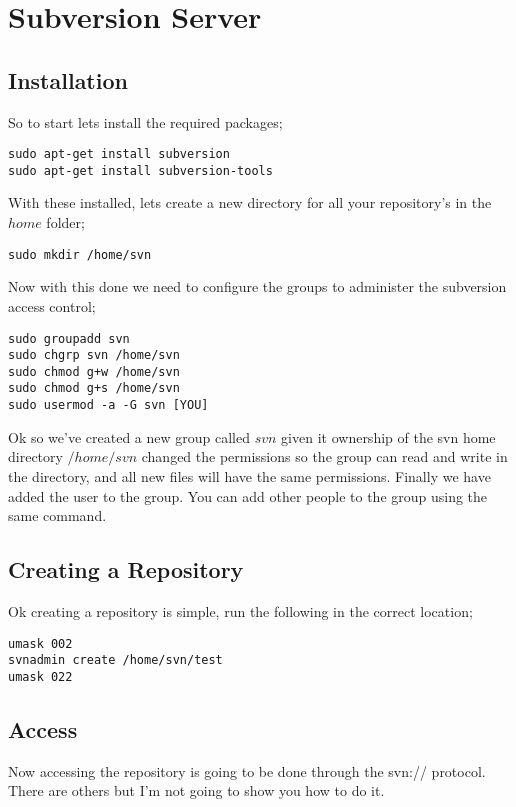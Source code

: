 \chapter{Subversion Server}
\label{chp:subversion}
\section{Installation}

So to start lets install the required packages;

\begin{lstlisting}
sudo apt-get install subversion
sudo apt-get install subversion-tools
\end{lstlisting}

With these installed, lets create a new directory for all your repository’s in the $home$ folder;

\begin{lstlisting}
sudo mkdir /home/svn
\end{lstlisting}

Now with this done we need to configure the groups to administer the subversion access control;

\begin{lstlisting}
sudo groupadd svn
sudo chgrp svn /home/svn
sudo chmod g+w /home/svn
sudo chmod g+s /home/svn
sudo usermod -a -G svn [YOU]
\end{lstlisting}

Ok so we've created a new group called $svn$ given it ownership of the svn home directory $/home/svn$ changed the permissions so the group can read and write in the directory, and all new files will have the same permissions. Finally we have added the user to the group.  You can add other people to the group using the same command.

\section{Creating a Repository}

Ok creating a repository is simple, run the following in the correct location;

\begin{lstlisting}
umask 002
svnadmin create /home/svn/test
umask 022
\end{lstlisting}

\section{Access}
\label{sec:subaccess}
Now accessing the repository is going to be done through the svn:// protocol.  There are others but I'm not going to show you how to do it.

